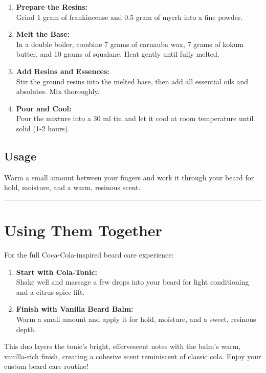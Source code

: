 \documentclass{article}
\begin{document}
\begin{enumerate}[leftmargin=*]
\item \textbf{Prepare the Resins:}\\
   Grind 1 gram of frankincense and 0.5 gram of myrrh into a fine powder.

\item \textbf{Melt the Base:}\\
   In a double boiler, combine 7 grams of carnauba wax, 7 grams of kokum butter, and 10 grams of squalane. Heat gently until fully melted.

\item \textbf{Add Resins and Essences:}\\
   Stir the ground resins into the melted base, then add all essential oils and absolutes. Mix thoroughly.

\item \textbf{Pour and Cool:}\\
   Pour the mixture into a 30 ml tin and let it cool at room temperature until solid (1-2 hours).
\end{enumerate}

\subsection*{Usage}
Warm a small amount between your fingers and work it through your beard for hold, moisture, and a warm, resinous scent.

\vspace{1em}
\hrule
\vspace{1em}

\section*{Using Them Together}

For the full Coca-Cola-inspired beard care experience:

\begin{enumerate}[leftmargin=*]
\item \textbf{Start with Cola-Tonic:}\\
   Shake well and massage a few drops into your beard for light conditioning and a citrus-spice lift.

\item \textbf{Finish with Vanilla Beard Balm:}\\
   Warm a small amount and apply it for hold, moisture, and a sweet, resinous depth.
\end{enumerate}

This duo layers the tonic's bright, effervescent notes with the balm's warm, vanilla-rich finish, creating a cohesive scent reminiscent of classic cola. Enjoy your custom beard care routine!
\end{document}
